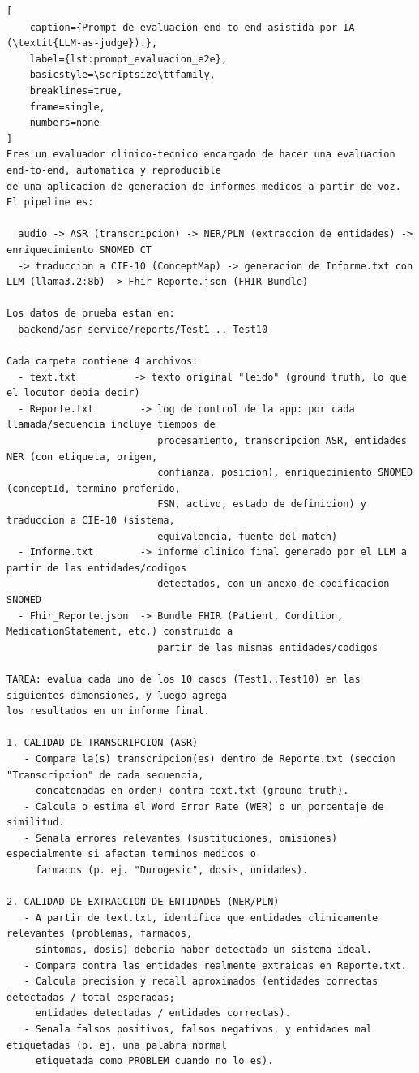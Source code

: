 \begin{lstlisting}[
    caption={Prompt de evaluación end-to-end asistida por IA (\textit{LLM-as-judge}).},
    label={lst:prompt_evaluacion_e2e},
    basicstyle=\scriptsize\ttfamily,
    breaklines=true,
    frame=single,
    numbers=none
]
Eres un evaluador clinico-tecnico encargado de hacer una evaluacion end-to-end, automatica y reproducible
de una aplicacion de generacion de informes medicos a partir de voz. El pipeline es:

  audio -> ASR (transcripcion) -> NER/PLN (extraccion de entidades) -> enriquecimiento SNOMED CT
  -> traduccion a CIE-10 (ConceptMap) -> generacion de Informe.txt con LLM (llama3.2:8b) -> Fhir_Reporte.json (FHIR Bundle)

Los datos de prueba estan en:
  backend/asr-service/reports/Test1 .. Test10

Cada carpeta contiene 4 archivos:
  - text.txt          -> texto original "leido" (ground truth, lo que el locutor debia decir)
  - Reporte.txt        -> log de control de la app: por cada llamada/secuencia incluye tiempos de
                          procesamiento, transcripcion ASR, entidades NER (con etiqueta, origen,
                          confianza, posicion), enriquecimiento SNOMED (conceptId, termino preferido,
                          FSN, activo, estado de definicion) y traduccion a CIE-10 (sistema,
                          equivalencia, fuente del match)
  - Informe.txt        -> informe clinico final generado por el LLM a partir de las entidades/codigos
                          detectados, con un anexo de codificacion SNOMED
  - Fhir_Reporte.json  -> Bundle FHIR (Patient, Condition, MedicationStatement, etc.) construido a
                          partir de las mismas entidades/codigos

TAREA: evalua cada uno de los 10 casos (Test1..Test10) en las siguientes dimensiones, y luego agrega
los resultados en un informe final.

1. CALIDAD DE TRANSCRIPCION (ASR)
   - Compara la(s) transcripcion(es) dentro de Reporte.txt (seccion "Transcripcion" de cada secuencia,
     concatenadas en orden) contra text.txt (ground truth).
   - Calcula o estima el Word Error Rate (WER) o un porcentaje de similitud.
   - Senala errores relevantes (sustituciones, omisiones) especialmente si afectan terminos medicos o
     farmacos (p. ej. "Durogesic", dosis, unidades).

2. CALIDAD DE EXTRACCION DE ENTIDADES (NER/PLN)
   - A partir de text.txt, identifica que entidades clinicamente relevantes (problemas, farmacos,
     sintomas, dosis) deberia haber detectado un sistema ideal.
   - Compara contra las entidades realmente extraidas en Reporte.txt.
   - Calcula precision y recall aproximados (entidades correctas detectadas / total esperadas;
     entidades detectadas / entidades correctas).
   - Senala falsos positivos, falsos negativos, y entidades mal etiquetadas (p. ej. una palabra normal
     etiquetada como PROBLEM cuando no lo es).


\end{lstlisting}

